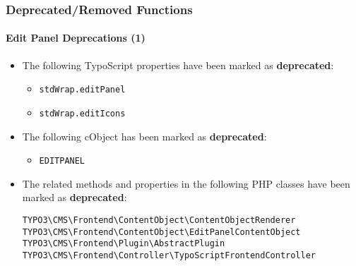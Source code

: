 %

\begin{frame}[fragile]
	\frametitle{Deprecated/Removed Functions}
	\framesubtitle{Edit Panel Deprecations (1)}


	\begin{itemize}
		\item The following TypoScript properties have been marked as \textbf{deprecated}:
			\begin{itemize}\small
				\item \texttt{stdWrap.editPanel}
				\item \texttt{stdWrap.editIcons}
			\end{itemize}\normalsize
		\item The following cObject has been marked as \textbf{deprecated}:
			\begin{itemize}\small
				\item \texttt{EDITPANEL}
			\end{itemize}\normalsize
		\item The related methods and properties in the following PHP classes
			have been marked as \textbf{deprecated}:
\begin{lstlisting}
TYPO3\CMS\Frontend\ContentObject\ContentObjectRenderer
TYPO3\CMS\Frontend\ContentObject\EditPanelContentObject
TYPO3\CMS\Frontend\Plugin\AbstractPlugin
TYPO3\CMS\Frontend\Controller\TypoScriptFrontendController
\end{lstlisting}
	\end{itemize}

\end{frame}

